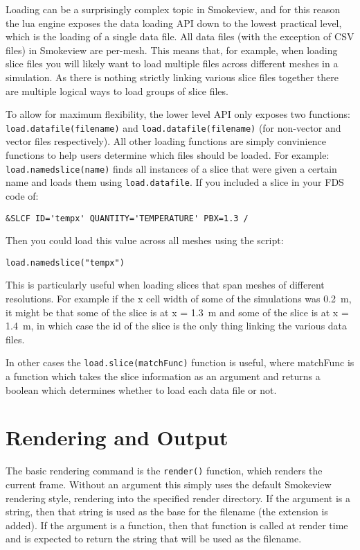 \documentclass[11pt,twoside]{book}
\begin{document}
Loading can be a surprisingly complex topic in Smokeview, and for this reason the lua engine exposes the data loading API down to the lowest practical level, which is the loading of a single data file. All data files (with the exception of CSV files) in Smokeview are per-mesh. This means that, for example, when loading slice files you will likely want to load multiple files across different meshes in a simulation. As there is nothing strictly linking various slice files together there are multiple logical ways to load groups of slice files.

To allow for maximum flexibility, the lower level API only exposes two
functions: \lstinline{load.datafile(filename)} and
\lstinline{load.datafile(filename)} (for non-vector and vector files
respectively). All other loading functions are simply convinience functions to
help users determine which files should be loaded. For example:
\lstinline{load.namedslice(name)} finds all instances of a slice that were given
a certain name and loads them using \lstinline{load.datafile}. If you included a slice in your FDS code of:

\begin{lstlisting}[style=lua]
&SLCF ID='tempx' QUANTITY='TEMPERATURE' PBX=1.3 /
\end{lstlisting}

Then you could load this value across all meshes using the script:

\begin{lstlisting}[style=lua]
load.namedslice("tempx")
\end{lstlisting}

This is particularly useful when loading slices that span meshes of different
resolutions. For example if the x cell width of some of the simulations was
0.2~m, it might be that some of the slice is at x = 1.3~m and some of the slice
is at x = 1.4~m, in which case the id of the slice is the only thing linking the
various data files.

In other cases the \lstinline{load.slice(matchFunc)} function is useful, where
matchFunc is a function which takes the slice information as an argument and
returns a boolean which determines whether to load each data file or not.

\section{Rendering and Output}

The basic rendering command is the \lstinline[style=lua]{render()} function,
which renders the current frame. Without an argument this simply uses the
default Smokeview rendering style, rendering into the specified render
directory. If the argument is a string, then that string is used as the base for
the filename (the extension is added). If the argument is a function, then that
function is called at render time and is expected to return the string that will
be used as the filename.
\end{document}
